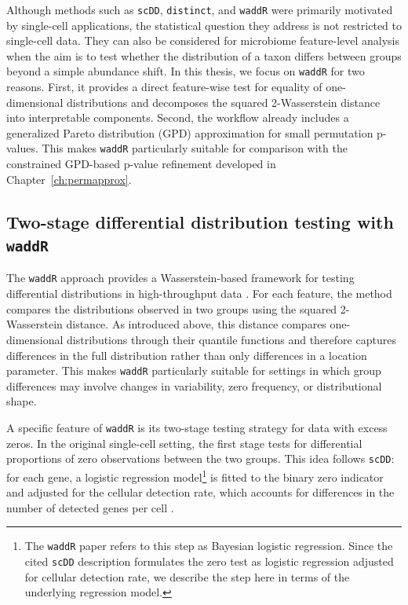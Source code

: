 Although methods such as \texttt{scDD}, \texttt{distinct}, and \texttt{waddR} were primarily motivated by single-cell applications, the statistical question they address is not restricted to single-cell data. They can also be considered for microbiome feature-level analysis when the aim is to test whether the distribution of a taxon differs between groups beyond a simple abundance shift. In this thesis, we focus on \texttt{waddR} for two reasons. First, it provides a direct feature-wise test for equality of one-dimensional distributions and decomposes the squared 2-Wasserstein distance into interpretable components. Second, the workflow already includes a generalized Pareto distribution (GPD) approximation for small permutation p-values. This makes \texttt{waddR} particularly suitable for comparison with the constrained GPD-based p-value refinement developed in Chapter~\ref{ch:permapprox}.

\subsection{Two-stage differential distribution testing with \texttt{waddR}}
\label{sec:4feature:diffdist_waddr}

The \texttt{waddR} approach provides a Wasserstein-based framework for testing differential distributions in high-throughput data \citep{schefzik2021fast}. For each feature, the method compares the distributions observed in two groups using the squared 2-Wasserstein distance. As introduced above, this distance compares one-dimensional distributions through their quantile functions and therefore captures differences in the full distribution rather than only differences in a location parameter. This makes \texttt{waddR} particularly suitable for settings in which group differences may involve changes in variability, zero frequency, or distributional shape.

A specific feature of \texttt{waddR} is its two-stage testing strategy for data with excess zeros. In the original single-cell setting, the first stage tests for differential proportions of zero observations between the two groups. This idea follows \texttt{scDD}: for each gene, a logistic regression model\footnote{The \texttt{waddR} paper refers to this step as Bayesian logistic regression. Since the cited \texttt{scDD} description formulates the zero test as logistic regression adjusted for cellular detection rate, we describe the step here in terms of the underlying regression model.} is fitted to the binary zero indicator and adjusted for the cellular detection rate, which accounts for differences in the number of detected genes per cell \citep{finak2015mast,korthauer2016statistical}. 

